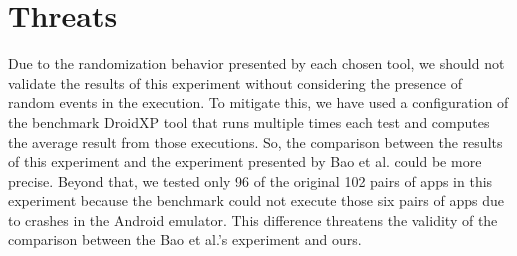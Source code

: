 \section{Threats}

Due to the randomization behavior presented by each chosen tool, we should not validate the results of this experiment without considering the presence of random events in the execution. To mitigate this, we have used a configuration of the benchmark DroidXP tool that runs multiple times each test and computes the average result from those executions. So, the comparison between the results of this experiment and the experiment presented by Bao et al. could be more precise.
Beyond that, we tested only 96 of the original 102 pairs of apps in this experiment because the benchmark could not execute those six pairs of apps due to crashes in the Android emulator. This difference threatens the validity of the comparison between the Bao et al.'s experiment and ours.
